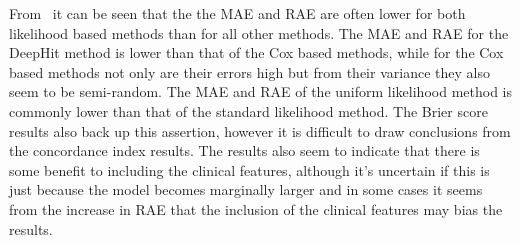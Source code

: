     From~ it can be seen that the the \gls{MAE} and \gls{RAE} are often lower for both likelihood based methods than for all other methods. The \gls{MAE} and \gls{RAE} for the DeepHit method is lower than that of the Cox based methods, while for the Cox based methods not only are their errors high but from their variance they also seem to be semi-random. The \gls{MAE} and \gls{RAE} of the uniform likelihood method is commonly lower than that of the standard likelihood method. The Brier score results also back up this assertion, however it is difficult to draw conclusions from the concordance index results. The results also seem to indicate that there is some benefit to including the clinical features, although it's uncertain if this is just because the model becomes marginally larger and in some cases it seems from the increase in \gls{RAE} that the inclusion of the clinical features may bias the results.

